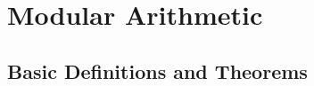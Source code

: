 
\section{Modular Arithmetic}
\label{sec:modular-arithmetic}

\subsection*{Basic Definitions and Theorems}
